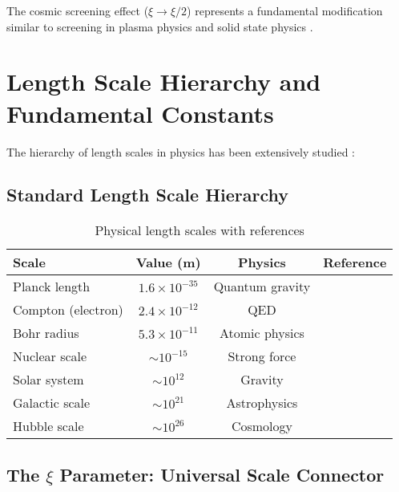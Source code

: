 \documentclass[12pt,a4paper]{article}
\begin{document}
	The cosmic screening effect ($\xi \to \xi/2$) represents a fundamental modification similar to screening in plasma physics \citep{chen1984} and solid state physics \citep{ashcroft1976}.
	
	\section{Length Scale Hierarchy and Fundamental Constants}
	\label{sec:length_scales}
	
	The hierarchy of length scales in physics has been extensively studied \citep{weinberg1995,wilczek2001,carr2007}:
	
	\subsection{Standard Length Scale Hierarchy}
	\label{subsec:standard_hierarchy}
	
	\begin{table}[htbp]
		\centering
		\begin{tabular}{lccc}
			\toprule
			\textbf{Scale} & \textbf{Value (m)} & \textbf{Physics} & \textbf{Reference} \\
			\midrule
			Planck length & $1.6 \times 10^{-35}$ & Quantum gravity & \citep{planck1900,weinberg1995} \\
			Compton (electron) & $2.4 \times 10^{-12}$ & QED & \citep{compton1923,peskin1995} \\
			Bohr radius & $5.3 \times 10^{-11}$ & Atomic physics & \citep{bohr1913,griffiths2004} \\
			Nuclear scale & $\sim 10^{-15}$ & Strong force & \citep{evans1955,perkins2000} \\
			Solar system & $\sim 10^{12}$ & Gravity & \citep{weinberg1972,will2014} \\
			Galactic scale & $\sim 10^{21}$ & Astrophysics & \citep{binney2008,carroll2006} \\
			Hubble scale & $\sim 10^{26}$ & Cosmology & \citep{weinberg2008,peebles1993} \\
			\bottomrule
		\end{tabular}
		\caption{Physical length scales with references}
		\label{tab:length_scales}
	\end{table}
	
	\subsection{The $\xi$ Parameter: Universal Scale Connector}
	\label{subsec:xi_universal}
	
\end{document}
